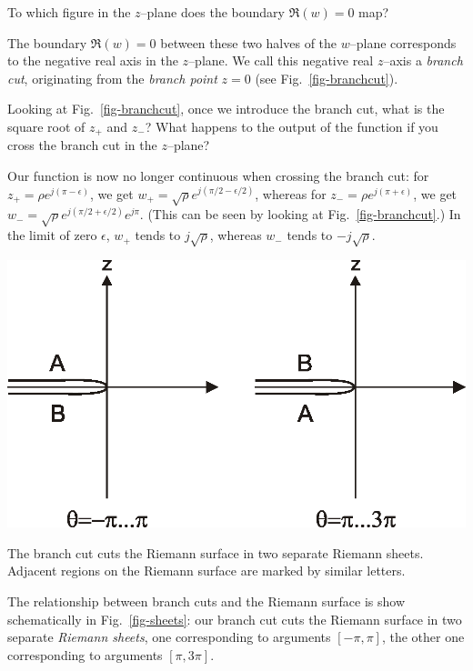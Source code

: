 \begin{cue}
To which figure in the $z$--plane does the boundary $\Re(w)=0$ map?
\end{cue}

The boundary $\Re(w)=0$ between these two halves of the $w$--plane corresponds to the negative real axis in the $z$--plane. We call this negative real $z$--axis a \emph{branch cut}, originating from the \emph{branch point} $z=0$ (see Fig.~\ref{fig-branchcut}).


\begin{cue}
Looking at Fig.~\ref{fig-branchcut}, once we introduce the branch cut, what is the square root of $z_+$ and $z_-$? What happens to the output of the function if you cross the branch cut in the $z$--plane? 
\end{cue}

Our function is now no longer continuous when crossing the branch cut: for $z_+ = \rho e^{j (\pi - \epsilon)}$, we get $w_+ = \sqrt{\rho} e^{j (\pi/2 - \epsilon/2)}$, whereas for $z_- = \rho e^{j (\pi + \epsilon)}$, we get $w_- = \sqrt{\rho} e^{j (\pi/2 + \epsilon/2)} e^{j \pi}$. (This can be seen by looking at Fig.~\ref{fig-branchcut}.) In the limit of zero $\epsilon$, $w_+$ tends to $j\sqrt{\rho}$, whereas $w_-$ tends to $-j\sqrt{\rho}$.

\begin{marginfigure}
\centering
\includegraphics{complex/figures/sheets}
\caption{The branch cut cuts the Riemann surface in two separate Riemann sheets.
Adjacent regions on the Riemann surface are marked by similar letters.}
\label{fig-sheets}
\end{marginfigure}

The relationship between branch cuts and the Riemann surface is show schematically in Fig.~\ref{fig-sheets}: our branch cut cuts the Riemann surface in two separate \emph{Riemann sheets}, one corresponding to arguments $[-\pi, \pi]$, the other one corresponding to arguments $[\pi,3 \pi]$.

